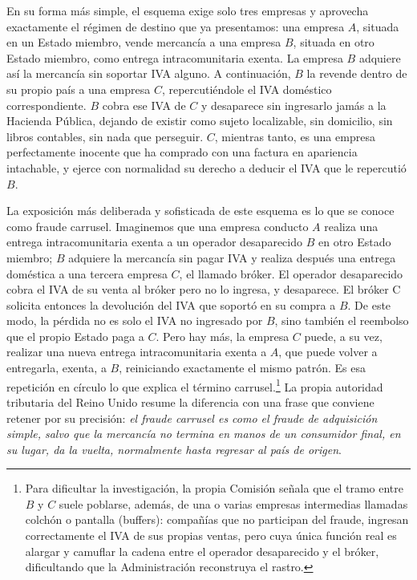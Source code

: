 \documentclass[10pt,a4paper]{article}
\begin{document}
\textcolor{\textbf{OJO -> Hay que hacer una breve introducción: \textit{parece perfecto pero no lo es...}}}

En su forma más simple, el esquema exige solo tres empresas y aprovecha exactamente el régimen de destino que ya presentamos: una empresa $A$, situada en un Estado miembro, vende mercancía a una empresa $B$, situada en otro Estado miembro, como entrega intracomunitaria exenta. La empresa $B$ adquiere así la mercancía sin soportar IVA alguno. A continuación, $B$ la revende dentro de su propio país a una empresa $C$, repercutiéndole el IVA doméstico correspondiente. $B$ cobra ese IVA de $C$ y desaparece sin ingresarlo jamás a la Hacienda Pública, dejando de existir como sujeto localizable, sin domicilio, sin libros contables, sin nada que perseguir. $C$, mientras tanto, es una empresa perfectamente inocente que ha comprado con una factura en apariencia intachable, y ejerce con normalidad su derecho a deducir el IVA que le repercutió $B$.

La exposición más deliberada y sofisticada de este esquema es lo que se conoce como fraude carrusel. Imaginemos que una empresa conducto $A$ realiza una entrega intracomunitaria exenta a un operador desaparecido $B$ en otro Estado miembro; $B$ adquiere la mercancía sin pagar IVA y realiza después una entrega doméstica a una tercera empresa $C$, el llamado bróker. El operador desaparecido cobra el IVA de su venta al bróker pero no lo ingresa, y desaparece. El bróker C solicita entonces la devolución del IVA que soportó en su compra a $B$. De este modo, la pérdida no es solo el IVA no ingresado por $B$, sino también el reembolso que el propio Estado paga a $C$. Pero hay más, la empresa $C$ puede, a su vez, realizar una nueva entrega intracomunitaria exenta a $A$, que puede volver a entregarla, exenta, a $B$, reiniciando exactamente el mismo patrón. Es esa repetición en círculo lo que explica el término carrusel.\footnote{%
    Para dificultar la investigación, la propia Comisión señala que el tramo entre $B$ y $C$ suele poblarse, además, de una o varias empresas intermedias llamadas colchón o pantalla (buffers): compañías que no participan del fraude, ingresan correctamente el IVA de sus propias ventas, pero cuya única función real es alargar y camuflar la cadena entre el operador desaparecido y el bróker, dificultando que la Administración reconstruya el rastro.
} La propia autoridad tributaria del Reino Unido resume la diferencia con una frase que conviene retener por su precisión: \textit{el fraude carrusel es como el fraude de adquisición simple, salvo que la mercancía no termina en manos de un consumidor final, en su lugar, da la vuelta, normalmente hasta regresar al país de origen}.
\end{document}
